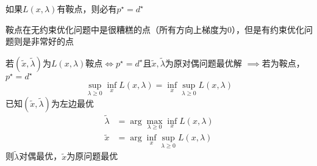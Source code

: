 如果$L(x,\lambda)$有鞍点，则必有$p^\star=d^\star$

鞍点在无约束优化问题中是很糟糕的点（所有方向上梯度为0），但是有约束优化问题则是非常好的点

若$(\tilde{x},\tilde{\lambda})$为$L(x,\lambda)$鞍点$\iff p^\star=d^\star$且$\tilde{x},\tilde{\lambda}$为原对偶问题最优解
$\implies$若为鞍点，$p^\star=d^\star$
\[\sup_{\lambda\geq 0}\inf_x L(x,\lambda)=\inf_x\sup_{\lambda\geq 0}L(x,\lambda)\]
已知$(\tilde{x},\tilde{\lambda})$为左边最优
\[\begin{aligned}
    \tilde{\lambda}&=\arg\max_{\lambda\geq 0}\inf_x L(x,\lambda)\\
    \tilde{x}&=\arg\inf_x\sup_{\lambda\geq 0}L(x,\lambda)
\end{aligned}\]
则$\tilde{\lambda}$对偶最优，$\tilde{x}$为原问题最优